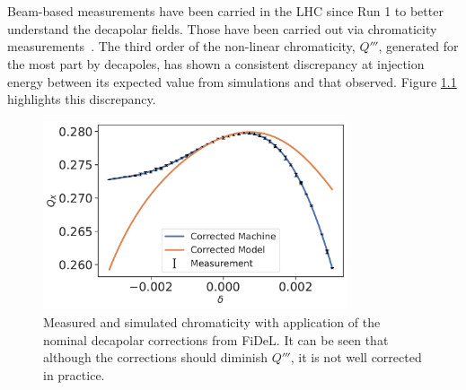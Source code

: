 \chapter{}
\label{chapter:decapoles}
\thumbforchapter{}

\section{}

\subsection{}

Beam-based measurements have been carried in the LHC since Run 1 to better understand the decapolar
fields. Those have been carried out via chromaticity
measurements~\cite{maclean_non-linear_2011,maclean_commissioning_2016,maclean_measurement_2014}. 
The third order of the non-linear chromaticity, $Q'''$, generated for the most part by decapoles,
has shown a consistent discrepancy at injection energy between its expected value from simulations
and that observed. Figure \ref{fig:decapoles:bare_chroma_vs_simulations} highlights this
discrepancy.

\begin{figure}[!htb]
    \centering
    \includegraphics[width=0.8\textwidth]{images/dq3_corrected_simulation_fidel.pdf}
    \caption{Measured and simulated chromaticity with application of the nominal decapolar
    corrections from FiDeL. It can be seen that although the corrections should diminish $Q'''$, it
    is not well corrected in practice.}
    \label{fig:decapoles:bare_chroma_vs_simulations}
\end{figure}

